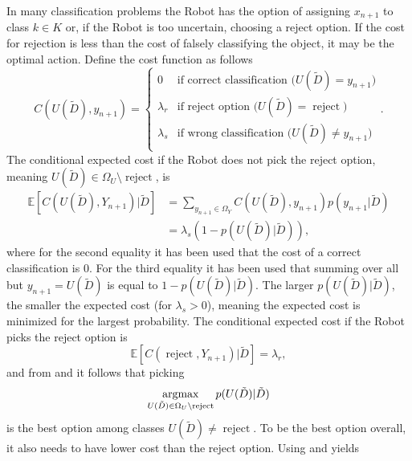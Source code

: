 \begin{example}
	In many classification problems the Robot has the option of assigning $x_{n+1}$ to class $k\in K$ or, if the Robot is too uncertain, choosing a reject option. If the cost for rejection is less than the cost of falsely classifying the object, it may be the optimal action. Define the cost function as follows
	\begin{equation}
		C(U(\tilde{D}),y_{n+1})=\begin{cases}
			0 & \text{if correct classification ($U(\tilde{D})=y_{n+1}$)}\\
			\lambda_r & \text{if reject option ($U(\tilde{D})=\operatorname{reject}$)}\\
			\lambda_s & \text{if wrong classification ($U(\tilde{D})\neq y_{n+1}$)}\\
		\end{cases}.
	\end{equation}
	The conditional expected cost if the Robot does not pick the reject option, meaning $U(\tilde{D})\in \Omega_U\setminus\operatorname{reject}$, is
	\begin{equation}
		\begin{split}
			\mathbb{E}[C(U(\tilde{D}), Y_{n+1})|\tilde{D}] & = \sum_{y_{n+1}\in \Omega_Y} C(U(\tilde{D}),y_{n+1})p(y_{n+1}|\tilde{D})\\
			&= \lambda_s(1-p(U(\tilde{D})|\tilde{D})),
		\end{split}
		\label{eq:cost1a}
	\end{equation}
	where for the second equality it has been used that the cost of a correct classification is $0$. For the third equality it has been used that summing over all but $y_{n+1} =U(\tilde{D})$ is equal to $1-p(U(\tilde{D})|\tilde{D})$. The larger $p(U(\tilde{D})|\tilde{D})$, the smaller the expected cost (for $\lambda_s>0$), meaning the expected cost is minimized for the largest probability. The conditional expected cost if the Robot picks the reject option is
	\begin{equation}
		\mathbb{E}[C(\operatorname{reject}, Y_{n+1})|\tilde{D}]=\lambda_r,
		\label{eq:cost2a}
	\end{equation}
	and from  and  it follows that picking 
	\begin{equation}
		\operatorname*{argmax}_{U(\tilde{D})\in \Omega_U\setminus \operatorname{reject}} p(U(\tilde{D})|\tilde{D})
	\end{equation}
	is the best option among classes $U(\tilde{D})\neq \operatorname{reject}$. To be the best option overall, it also needs to have lower cost than the reject option. Using  and  yields

\end{example}
